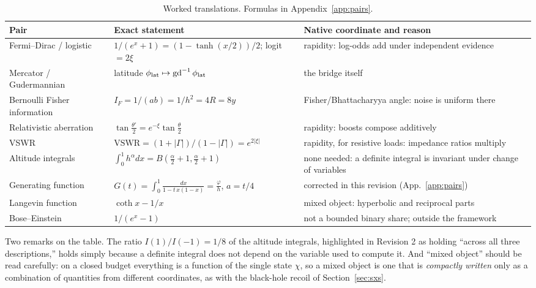 \documentclass[11pt]{article}
\theoremstyle{definition}
\theoremstyle{remark}
\newcommand{\gd}{\operatorname{gd}}
\begin{document}
\begin{table}[ht]
\centering\small
\caption{Worked translations. Formulas in Appendix~\ref{app:pairs}.}
\label{tab:pairs}
\begin{tabular}{@{}p{}p{}p{}@{}}
\toprule
Pair & Exact statement & Native coordinate and reason\\
\midrule
Fermi--Dirac / logistic & $1/(e^x+1)=(1-\tanh(x/2))/2$; logit $=2\xi$ & rapidity: log-odds add under independent evidence~\cite{Pathria2011,Good1950}\\
Mercator / Gudermannian & latitude $\phi_{\rm lat}\mapsto\gd^{-1}\phi_{\rm lat}$ & the bridge itself~\cite{Snyder1987}\\
Bernoulli Fisher information & $I_F=1/(ab)=1/h^2=4R=8y$ & Fisher/Bhattacharyya angle: noise is uniform there~\cite{Fisher1925,Bhattacharyya1943}\\
Relativistic aberration & $\tan\frac{\theta'}{2}=e^{-\xi}\tan\frac\theta2$ & rapidity: boosts compose additively~\cite{Rindler2006}\\
VSWR & $\mathrm{VSWR}=(1+|\Gamma|)/(1-|\Gamma|)=e^{2|\xi|}$ & rapidity, for resistive loads: impedance ratios multiply~\cite{Pozar2012}\\
Altitude integrals & $\int_0^1 h^\alpha dx=B(\frac\alpha2+1,\frac\alpha2+1)$ & none needed: a definite integral is invariant under change of variables\\
Generating function & $G(t)=\int_0^1\!\frac{dx}{1-t\,x(1-x)}=\frac{\varphi}{h}$, $a=t/4$ & corrected in this revision (App.~\ref{app:pairs})\\
\midrule
Langevin function & $\coth x-1/x$ & mixed object: hyperbolic and reciprocal parts\\
Bose--Einstein & $1/(e^x-1)$ & not a bounded binary share; outside the framework\\
\bottomrule
\end{tabular}
\end{table}

Two remarks on the table. The ratio $I(1)/I(-1)=1/8$ of the altitude integrals, highlighted
in Revision 2 as holding ``across all three descriptions,'' holds simply because a definite
integral does not depend on the variable used to compute it. And ``mixed object'' should be
read carefully: on a closed budget everything is a function of the single state $\chi$, so a
mixed object is one that is \emph{compactly written} only as a combination of quantities
from different coordinates, as with the black-hole recoil of Section~\ref{sec:sxs}.
\end{document}
